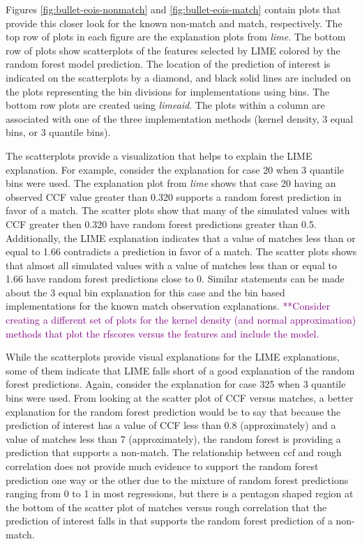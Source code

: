 \documentclass[AMS,STIX2COL]{WileyNJD-v2}\usepackage[]{graphicx}\usepackage[]{color}
\newcommand{\kgc}[1]{\textcolor{purple}{#1}}
\begin{document}
{Figures \ref{fig:bullet-eois-nonmatch} and \ref{fig:bullet-eois-match} contain plots that provide this closer look for the known non-match and match, respectively. The top row of plots in each figure are the explanation plots from \emph{lime}. The bottom row of plots show scatterplots of the features selected by LIME colored by the random forest model prediction. The location of the prediction of interest is indicated on the scatterplots by a diamond, and black solid lines are included on the plots representing the bin divisions for implementations using bins. The bottom row plots are created using \emph{limeaid}. The plots within a column are associated with one of the three implementation methods (kernel density, 3 equal bins, or 3 quantile bins).

The scatterplots provide a visualization that helps to explain the LIME explanation. For example, consider the explanation for case 20 when 3 quantile bins were used. The explanation plot from \emph{lime} shows that case 20 having an observed CCF value greater than 0.320 supports a random forest prediction in favor of a match. The scatter plots show that many of the simulated values with CCF greater then 0.320 have random forest predictions greater than 0.5. Additionally, the LIME explanation indicates that a value of matches less than or equal to 1.66 contradicts a prediction in favor of a match. The scatter plots shows that almost all simulated values with a value of matches less than or equal to 1.66 have random forest predictions close to 0. Similar statements can be made about the 3 equal bin explanation for this case and the bin based implementations for the known match observation explanations. \kgc{**Consider creating a different set of plots for the kernel density (and normal approximation) methods that plot the rfscores versus the features and include the model.}

While the scatterplots provide visual explanations for the LIME explanations, some of them indicate that LIME falls short of a good explanation of the random forest predictions. Again, consider the explanation for case 325 when 3 quantile bins were used. From looking at the scatter plot of CCF versus matches, a better explanation for the random forest prediction would be to say that because the prediction of interest has a value of CCF less than 0.8 (approximately) and a value of matches less than 7 (approximately), the random forest is providing a prediction that supports a non-match. The relationship between ccf and rough correlation does not provide much evidence to support the random forest prediction one way or the other due to the mixture of random forest predictions ranging from 0 to 1 in most regressions, but there is a pentagon shaped region at the bottom of the scatter plot of matches versus rough correlation that the prediction of interest falls in that supports the random forest prediction of a non-match.



}
\end{document}
